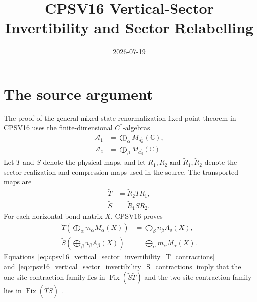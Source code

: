 \documentclass{article}
\title{CPSV16 Vertical-Sector Invertibility and Sector Relabelling}
\author{}
\date{2026-07-19}
\begin{document}
\maketitle
{}

\section{The source argument}

The proof of the general mixed-state renormalization fixed-point theorem in
CPSV16 uses the finite-dimensional $C^*$-algebras
\begin{align}
    \mathcal A_1
        &= \bigoplus_\alpha M_{d^1_\alpha}(\mathbb C),
    \label{eq:cpsv16_vertical_sector_invertibility_first_sector_algebra}\\
    \mathcal A_2
        &= \bigoplus_\beta M_{d^2_\beta}(\mathbb C).
    \label{eq:cpsv16_vertical_sector_invertibility_second_sector_algebra}
\end{align}
Let $T$ and $S$ denote the physical maps, and let $R_1,R_2$ and
$\widetilde R_1,\widetilde R_2$ denote the sector realization and compression
maps used in the source. The transported maps are
\begin{align}
    \widetilde T
        &= \widetilde R_2 T R_1,
    \label{eq:cpsv16_vertical_sector_invertibility_transported_T}\\
    \widetilde S
        &= \widetilde R_1 S R_2.
    \label{eq:cpsv16_vertical_sector_invertibility_transported_S}
\end{align}
For each horizontal bond matrix $X$, CPSV16 proves
\begin{align}
    \widetilde T\!\left(\bigoplus_\alpha m_\alpha M_\alpha(X)\right)
        &= \bigoplus_\beta n_\beta A_\beta(X),
    \label{eq:cpsv16_vertical_sector_invertibility_T_contractions}\\
    \widetilde S\!\left(\bigoplus_\beta n_\beta A_\beta(X)\right)
        &= \bigoplus_\alpha m_\alpha M_\alpha(X).
    \label{eq:cpsv16_vertical_sector_invertibility_S_contractions}
\end{align}
Equations~\ref{eq:cpsv16_vertical_sector_invertibility_T_contractions}
and~\ref{eq:cpsv16_vertical_sector_invertibility_S_contractions} imply that
the one-site contraction family lies in
$\operatorname{Fix}(\widetilde S\widetilde T)$ and the two-site contraction
family lies in $\operatorname{Fix}(\widetilde T\widetilde S)$
\cite[Appendix~C.4, lines~1972--1980]{Cirac2016MPDO_arXiv}.
\end{document}
